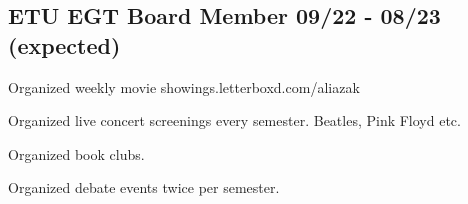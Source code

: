 \documentclass[a4paper,12pt]{article}
\begin{document}
\vspace*{10pt}
\subsection{{ETU EGT Board Member }\hfill 09/22 - 08/23 (expected)}
\begin{zitemize}
\item Organized weekly movie showings.\hfill letterboxd.com/aliazak
\item Organized live concert screenings every semester. Beatles, Pink Floyd etc.
\item Organized book clubs.
\item Organized debate events twice per semester.

\end{zitemize}
\end{document}
